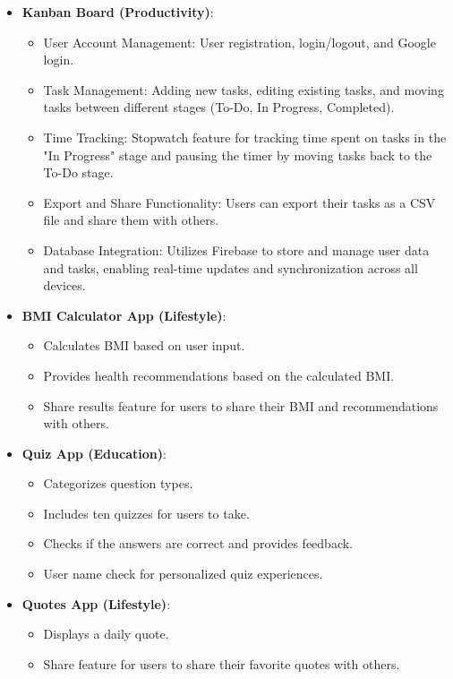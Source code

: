 \begin{itemize}
\item \textbf{Kanban Board (Productivity)}:
\begin{itemize}
\item User Account Management: User registration, login/logout, and Google login.
\item Task Management: Adding new tasks, editing existing tasks, and moving tasks between different stages (To-Do, In Progress, Completed).
\item Time Tracking: Stopwatch feature for tracking time spent on tasks in the "In Progress" stage and pausing the timer by moving tasks back to the To-Do stage.
\item Export and Share Functionality: Users can export their tasks as a CSV file and share them with others.
\item Database Integration: Utilizes Firebase to store and manage user data and tasks, enabling real-time updates and synchronization across all devices.
\end{itemize}
\item \textbf{BMI Calculator App (Lifestyle)}:
\begin{itemize}
\item Calculates BMI based on user input.
\item Provides health recommendations based on the calculated BMI.
\item Share results feature for users to share their BMI and recommendations with others.
\end{itemize}
\item \textbf{Quiz App (Education)}:
\begin{itemize}
\item Categorizes question types.
\item Includes ten quizzes for users to take.
\item Checks if the answers are correct and provides feedback.
\item User name check for personalized quiz experiences.
\end{itemize}
\item \textbf{Quotes App (Lifestyle)}:
\begin{itemize}
\item Displays a daily quote.
\item Share feature for users to share their favorite quotes with others.
\end{itemize}
\end{itemize}

